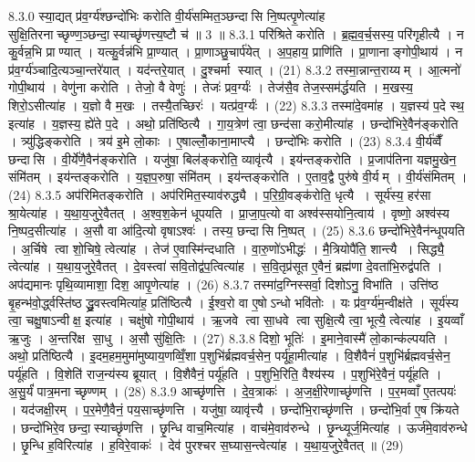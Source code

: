 8.3.0
स्या॒द्यत् प्र॑व॒र्ग्य॑श्छन्दो॑भिः करोति वी॒र्य॑सम्मित॒ञ्छन्दासि नि॒ष्पत्पृ॒णेत्या॑ह सुक्षि॒तिरनाच्छृण्ण॒ञ्छन्दा॒स्याच्छृ॑णत्त्य॒ष्टौ च॑ ॥ 3 ॥
8.3.1
परि॑श्रिते करोति । ब्र॒ह्म॒व॒र्च॒सस्य॒ परि॑गृहीत्यै । न कु॒र्वन्न॒भि प्राण्यात् । यत्कु॒र्वन्न॑भि प्रा॒ण्यात् । प्रा॒णाञ्छु॒चार्प॑येत् । अ॒प॒हाय॒ प्राणि॑ति । प्रा॒णानाङ्गोपी॒थाय॑ । न प्र॑व॒र्ग्य॑ञ्चादि॒त्यञ्चा॒न्तरे॑यात् । यद॑न्तरे॒यात् । दु॒श्चर्मा स्यात् । (21)
8.3.2
तस्मा॒न्नान्त॒राय्यम् । आ॒त्मनो॑ गोपी॒थाय॑ । वेणु॑ना करोति । तेजो॒ वै वेणुः॑ । तेजः॑ प्रव॒र्ग्यः॑ । तेज॑सै॒व तेज॒स्सम॑र्द्धयति । म॒खस्य॒ शिरो॒ऽसीत्या॑ह । य॒ज्ञो वै म॒खः । तस्यै॒तच्छिरः॑ । यत्प्र॑व॒र्ग्यः॑ । (22)
8.3.3
तस्मा॑दे॒वमा॑ह । य॒ज्ञस्य॑ प॒दे स्थ॒ इत्या॑ह । य॒ज्ञस्य॒ ह्ये॑ते प॒दे । अथो॒ प्रति॑ष्ठित्यै । गा॒य॒त्रेण॑ त्वा॒ छन्द॑सा करो॒मीत्या॑ह । छन्दो॑भिरे॒वैन॑ङ्करोति । त्र्यु॑द्धिङ्करोति । त्रय॑ इ॒मे लो॒काः । ए॒षाल्लोँ॒काना॒माप्त्यै । छन्दो॑भिः करोति । (23)
8.3.4
वी॒र्य॑व्वैँ छन्दासि । वी॒र्ये॑णै॒वैन॑ङ्करोति । यजु॑षा॒ बिल॑ङ्करोति॒ व्यावृ॑त्यै । इय॑न्तङ्करोति । प्र॒जाप॑तिना यज्ञमु॒खेन॒ संमि॑तम् । इय॑न्तङ्करोति । य॒ज्ञ॒प॒रुषा॒ संमि॑तम् । इय॑न्तङ्करोति । ए॒ताव॒द्वै पुरु॑षे वी॒र्यम् । वी॒र्य॑संमितम् । (24)
8.3.5
अप॑रिमितङ्करोति । अप॑रिमित॒स्याव॑रुद्ध्यै । प॒रि॒ग्री॒वङ्क॑रोति॒ धृत्यै । सूर्य॑स्य॒ हर॑सा श्रा॒येत्या॑ह । य॒था॒य॒जुरे॒वैतत् । अ॒श्व॒श॒केन॑ धूपयति । प्रा॒जा॒प॒त्यो वा अश्व॑स्सयोनि॒त्वाय॑ । वृष्णो॒ अश्व॑स्य नि॒ष्पद॒सीत्या॑ह । अ॒सौ वा आ॑दि॒त्यो वृषाऽश्वः॑ । तस्य॒ छन्दासि नि॒ष्पत् । (25)
8.3.6
छन्दो॑भिरे॒वैन॑न्धूपयति । अ॒र्चिषे त्वा शो॒चिषे॒ त्वेत्या॑ह । तेज॑ ए॒वास्मि॑न्दधाति । वा॒रु॒णो॑ऽभीद्धः॑ । मै॒त्रियोपै॑ति॒ शान्त्यै । सिद्ध्यै॒ त्वेत्या॑ह । य॒था॒य॒जुरे॒वैतत् । दे॒वस्त्वा॑ सवि॒तोद्व॑प॒त्वित्या॑ह । स॒वि॒तृप्र॑सूत ए॒वैनं॒ ब्रह्म॑णा दे॒वता॑भि॒रुद्व॑पति । अप॑द्यमानः पृथि॒व्यामाशा॒ दिश॒ आपृ॒णेत्या॑ह । (26)
8.3.7
तस्मा॑द॒ग्निस्सर्वा॒ दिशोऽनु॒ विभा॑ति । उत्ति॑ष्ठ बृ॒हन्भ॑वो॒र्द्ध्वस्ति॑ष्ठ द्ध्रु॒वस्त्वमित्या॑ह॒ प्रति॑ष्ठित्यै । ई॒श्व॒रो वा ए॒षोऽन्धो भवि॑तोः । यः प्र॑व॒र्ग्य॑म॒न्वीक्ष॑ते । सूर्य॑स्य त्वा॒ चक्षु॒षाऽन्वीक्ष॒ इत्या॑ह । चक्षु॑षो गोपी॒थाय॑ । ऋ॒जवे त्वा सा॒धवे त्वा सुक्षि॒त्यै त्वा॒ भूत्यै॒ त्वेत्या॑ह । इ॒यव्वाँ ऋ॒जुः । अ॒न्तरि॑क्ष सा॒धु । अ॒सौ सु॑क्षि॒तिः । (27)
8.3.8
दिशो॒ भूतिः॑ । इ॒माने॒वास्मै॑ लो॒कान्क॑ल्पयति । अथो॒ प्रति॑ष्ठित्यै । इ॒दम॒हम॒मुमा॑मुष्याय॒णव्विँ॒शा प॒शुभि॑र्ब्रह्मवर्च॒सेन॒ पर्यू॑हा॒मीत्या॑ह । वि॒शैवैनं॑ प॒शुभि॑र्ब्रह्मवर्च॒सेन॒ पर्यू॑हति । वि॒शेति॑ राज॒न्य॑स्य ब्रूयात् । वि॒शैवैनं॒ पर्यू॑हति । प॒शुभि॒रिति॒ वैश्य॑स्य । प॒शुभि॑रे॒वैनं॒ पर्यू॑हति । अ॒सु॒र्यं॑ पात्र॒मनाच्छृण्णम् । (28)
8.3.9
आच्छृ॑णत्ति । दे॒व॒त्राकः॑ । अ॒ज॒क्षी॒रेणाच्छृ॑णत्ति । प॒र॒मव्वाँ ए॒तत्पयः॑ । यद॑जक्षी॒रम् । प॒र॒मेणै॒वैनं॒ पय॒साच्छृ॑णत्ति । यजु॑षा॒ व्यावृ॑त्त्यै । छन्दो॑भि॒राच्छृ॑णत्ति । छन्दो॑भि॒र्वा ए॒ष क्रि॑यते । छन्दो॑भिरे॒व छन्दा॒स्याच्छृ॑णत्ति । छृ॒न्धि वाच॒मित्या॑ह । वाच॑मे॒वाव॑रुन्धे । छृ॒न्ध्यूर्ज॒मित्या॑ह । ऊर्ज॑मे॒वाव॑रुन्धे । छृ॒न्धि ह॒विरित्या॑ह । ह॒विरे॒वाकः॑ । देव॑ पुरश्चर स॒घ्यास॒न्त्वेत्या॑ह । य॒था॒य॒जुरे॒वैतत् ॥ (29)
\anuvakamend

